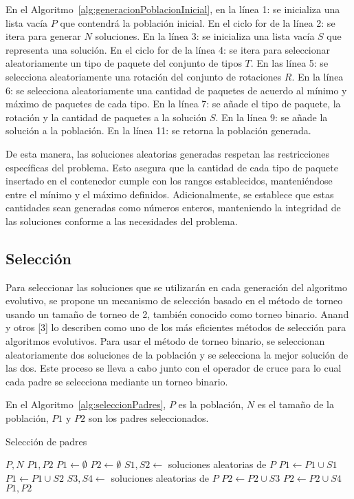 En el Algoritmo~\ref{alg:generacionPoblacionInicial}, en la línea 1: se inicializa una lista vacía $P$ que contendrá la población inicial. En el ciclo for de la línea 2: se itera para generar $N$ soluciones. En la línea 3: se inicializa una lista vacía $S$ que representa una solución. En el ciclo for de la línea 4: se itera para seleccionar aleatoriamente un tipo de paquete del conjunto de tipos $T$. En las línea 5: se selecciona aleatoriamente una rotación del conjunto de rotaciones $R$. En la línea 6: se selecciona aleatoriamente una cantidad de paquetes de acuerdo al mínimo y máximo de paquetes de cada tipo. En la línea 7: se añade el tipo de paquete, la rotación y la cantidad de paquetes a la solución $S$. En la línea 9: se añade la solución a la población. En la línea 11: se retorna la población generada.

De esta manera, las soluciones aleatorias generadas respetan las restricciones específicas del problema. Esto asegura que la cantidad de cada tipo de paquete insertado en el contenedor cumple con los rangos establecidos, manteniéndose entre el mínimo y el máximo definidos. Adicionalmente, se establece que estas cantidades sean generadas como números enteros, manteniendo la integridad de las soluciones conforme a las necesidades del problema.

\subsection{Selección}

Para seleccionar las soluciones que se utilizarán en cada generación del algoritmo evolutivo, se propone un mecanismo de selección basado en el método de torneo usando un tamaño de torneo de 2, también conocido como torneo binario. Anand y otros [3] lo describen como uno de los más eficientes métodos de selección para algoritmos evolutivos. Para usar el método de torneo binario, se seleccionan aleatoriamente dos soluciones de la población y se selecciona la mejor solución de las dos. Este proceso se lleva a cabo junto con el operador de cruce para lo cual cada padre se selecciona mediante un torneo binario.

En el Algoritmo~\ref{alg:seleccionPadres}, $P$ es la población, $N$ es el tamaño de la población, $P1$ y $P2$ son los padres seleccionados.

\begin{algorithm}[H]
    \caption{Selección de padres}\label{alg:seleccionPadres}
    \begin{algorithmic}[1]
        \Require $P, N$
        \Ensure $P1, P2$
        \State $P1 \leftarrow \emptyset$
        \State $P2 \leftarrow \emptyset$
        \State $S1, S2 \leftarrow$ soluciones aleatorias de $P$
        \State $P1 \leftarrow P1 \cup S1$
        \Else
        \State $P1 \leftarrow P1 \cup S2$
        \EndIf
        \State $S3, S4 \leftarrow$ soluciones aleatorias de $P$
        \State $P2 \leftarrow P2 \cup S3$
        \Else
        \State $P2 \leftarrow P2 \cup S4$
        \EndIf
        \EndFor
        \State \Return $P1, P2$
    \end{algorithmic}
\end{algorithm}

